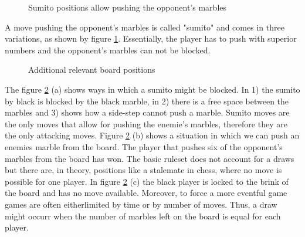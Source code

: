 \begin{figure}[!h]
    \centering
    \hfill
    \hfill
    \caption{Sumito positions allow pushing the opponent's marbles \cite{abalone_sa_abalone_nodate}}
    \label{sumito}
\end{figure}

A move pushing the opponent's marbles is called "sumito" and comes in three variations, as shown by figure \ref{sumito}. Essentially, the player has to push with superior numbers and the opponent's marbles can not be blocked.

\begin{figure}[!h]
    \centering
    \hfill
    \hfill
    \caption{Additional relevant board positions \cite{abalone_sa_abalone_nodate}}
    \label{additional_relevant_positions}
\end{figure}

The figure \ref{additional_relevant_positions} (a) shows ways in which a sumito might be blocked. In 1) the sumito by black is blocked by the black marble, in 2) there is a free space between the marbles and 3) shows how a side-step cannot push a marble. Sumito moves are the only moves that allow for pushing the enemie's marbles, therefore they are the only attacking moves. Figure \ref{additional_relevant_positions} (b) shows a situation in which we can push an enemies marble from the board. The player that pushes six of the opponent's marbles from the board has won. The basic ruleset does not account for a draws but there are, in theory, positions like a stalemate in chess, where no move is possible for one player. In figure \ref{additional_relevant_positions} (c) the black player is locked to the brink of the board and has no move available. Moreover, to force a more eventful game games are often eitherlimited by time or by number of moves. Thus, a draw might occurr when the number of marbles left on the board is equal for each player.

